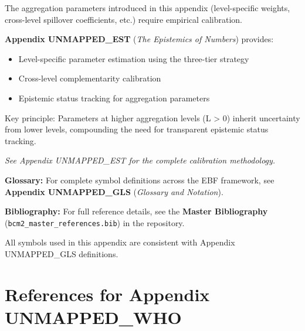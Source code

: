 The aggregation parameters introduced in this appendix (level-specific weights, 
cross-level spillover coefficients, etc.) require empirical calibration.

\textbf{Appendix UNMAPPED_EST} (\textit{The Epistemics of Numbers}) provides:
\begin{itemize}[nosep]
    \item Level-specific parameter estimation using the three-tier strategy
    \item Cross-level complementarity calibration
    \item Epistemic status tracking for aggregation parameters
\end{itemize}

Key principle: Parameters at higher aggregation levels (L > 0) inherit 
uncertainty from lower levels, compounding the need for transparent 
epistemic status tracking.

\noindent\textit{See Appendix UNMAPPED_EST for the complete calibration methodology.}




\begin{tcolorbox}[colback=blue!5!white, colframe=blue!75!black, 
    title=\textbf{Central References}]

\textbf{Glossary:} For complete symbol definitions across the EBF framework, 
see \textbf{Appendix UNMAPPED_GLS} (\textit{Glossary and Notation}).

\textbf{Bibliography:} For full reference details, see the 
\textbf{Master Bibliography} (\texttt{bcm2\_master\_references.bib}) 
in the repository.

All symbols used in this appendix are consistent with Appendix UNMAPPED_GLS definitions.

\end{tcolorbox}

\section{References for Appendix UNMAPPED_WHO}
\label{sec:aaa-references}

%
%

